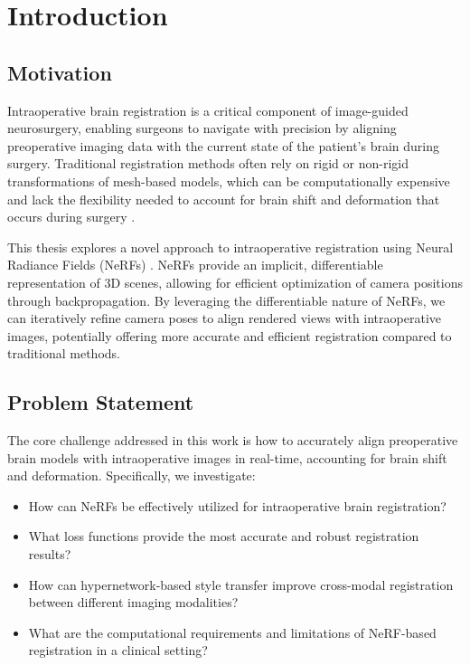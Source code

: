 \chapter{Introduction}

\section{Motivation}
Intraoperative brain registration is a critical component of image-guided neurosurgery, enabling surgeons to navigate with precision by aligning preoperative imaging data with the current state of the patient's brain during surgery. Traditional registration methods often rely on rigid or non-rigid transformations of mesh-based models, which can be computationally expensive and lack the flexibility needed to account for brain shift and deformation that occurs during surgery \cite{maier2017surgical}.

This thesis explores a novel approach to intraoperative registration using Neural Radiance Fields (NeRFs) \cite{mildenhall2020nerf}. NeRFs provide an implicit, differentiable representation of 3D scenes, allowing for efficient optimization of camera positions through backpropagation. By leveraging the differentiable nature of NeRFs, we can iteratively refine camera poses to align rendered views with intraoperative images, potentially offering more accurate and efficient registration compared to traditional methods.

\section{Problem Statement}
The core challenge addressed in this work is how to accurately align preoperative brain models with intraoperative images in real-time, accounting for brain shift and deformation. Specifically, we investigate:

\begin{itemize}
    \item How can NeRFs be effectively utilized for intraoperative brain registration?
    \item What loss functions provide the most accurate and robust registration results?
    \item How can hypernetwork-based style transfer improve cross-modal registration between different imaging modalities?
    \item What are the computational requirements and limitations of NeRF-based registration in a clinical setting?
\end{itemize}

